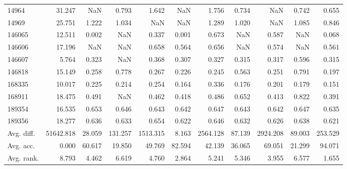 \begin{tabular}{lrrrrrrrrrr}
14964 & 31.247 & NaN & 0.793 & 1.642 & NaN & 1.756 & 0.734 & NaN & 0.742 & 0.655 \\
14969 & 25.751 & 1.222 & 1.034 & NaN & NaN & 1.289 & 1.020 & NaN & 1.085 & 0.846 \\
146065 & 12.511 & 0.002 & NaN & 0.337 & 0.001 & 0.673 & NaN & 0.587 & NaN & 0.068 \\
146606 & 17.196 & NaN & NaN & 0.658 & 0.564 & 0.656 & NaN & 0.574 & NaN & 0.561 \\
146607 & 5.764 & 0.323 & NaN & 0.368 & 0.307 & 0.327 & 0.315 & 0.317 & 0.596 & 0.315 \\
146818 & 15.149 & 0.258 & 0.778 & 0.267 & 0.226 & 0.245 & 0.563 & 0.251 & 0.791 & 0.197 \\
168335 & 10.017 & 0.225 & 0.214 & 0.254 & 0.164 & 0.336 & 0.176 & 0.201 & 0.179 & 0.151 \\
168911 & 18.475 & 0.491 & NaN & 0.462 & 0.418 & 0.486 & 0.652 & 0.413 & 0.822 & 0.391 \\
189354 & 16.535 & 0.653 & 0.646 & 0.643 & 0.642 & 0.647 & 0.643 & 0.642 & 0.647 & 0.635 \\
189356 & 18.277 & 0.636 & 0.633 & 0.654 & 0.622 & 0.646 & 0.632 & 0.626 & 0.638 & 0.621 \\
Avg. diff. & 51642.818 & 28.059 & 131.257 & 1513.315 & 8.163 & 2564.128 & 87.139 & 2924.208 & 89.003 & 253.529 \\
Avg. acc. & 0.000 & 60.617 & 19.850 & 49.769 & 82.594 & 42.139 & 36.065 & 69.051 & 21.299 & 94.071 \\
Avg. rank. & 8.793 & 4.462 & 6.619 & 4.760 & 2.864 & 5.241 & 5.346 & 3.955 & 6.577 & 1.655 \\
\bottomrule
\end{tabular}
